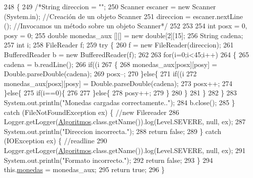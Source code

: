 \begin{DoxyCode}
248     \{
249         \textcolor{comment}{/*String direccion = "";}
250 \textcolor{comment}{        Scanner escaner = new Scanner (System.in); //Creación de un objeto Scanner}
251 \textcolor{comment}{        direccion = escaner.nextLine (); //Invocamos un método sobre un objeto Scanner*/}
252         
253         
254         \textcolor{keywordtype}{int} posx = 0, posy = 0;
255         \textcolor{keywordtype}{double} monedas\_aux [][] = \textcolor{keyword}{new} \textcolor{keywordtype}{double}[2][15];
256         String cadena;
257         \textcolor{keywordtype}{int} i;
258         FileReader f;
259         \textcolor{keywordflow}{try} \{
260             f = \textcolor{keyword}{new} FileReader(direccion);
261             BufferedReader b = \textcolor{keyword}{new} BufferedReader(f);
262             
263             \textcolor{keywordflow}{for}(i=0;i<45;i++)
264             \{
265                 cadena = b.readLine();
266                 \textcolor{keywordflow}{if}((i%
267                 \{
268                     monedas\_aux[posx][posy] = Double.parseDouble(cadena);
269                     posx--;
270                 \}\textcolor{keywordflow}{else}\{
271                     \textcolor{keywordflow}{if}((i%
272                         monedas\_aux[posx][posy] = Double.parseDouble(cadena);
273                         posx++;
274                     \}\textcolor{keywordflow}{else}\{
275                         \textcolor{keywordflow}{if}(i==0)\{
276                             
277                         \}\textcolor{keywordflow}{else}\{
278                             posy++;
279                         \}
280                     \}
281                 \}
282             \}
283             System.out.println(\textcolor{stringliteral}{"Monedas cargadas correctamente.."});
284             b.close();
285         \} \textcolor{keywordflow}{catch} (FileNotFoundException ex) \{ \textcolor{comment}{//new Filereader}
286             Logger.getLogger(\mbox{\hyperlink{classalgoritmia2_1_1_algoritmos_af7746e9d1d89571233f5e9f05a429603}{Algoritmos}}.class.getName()).log(Level.SEVERE, null, ex);
287             System.out.println(\textcolor{stringliteral}{"Direccion incorrecta."});
288             \textcolor{keywordflow}{return} \textcolor{keyword}{false};
289         \} \textcolor{keywordflow}{catch} (IOException ex) \{ \textcolor{comment}{//readline}
290             Logger.getLogger(\mbox{\hyperlink{classalgoritmia2_1_1_algoritmos_af7746e9d1d89571233f5e9f05a429603}{Algoritmos}}.class.getName()).log(Level.SEVERE, null, ex);
291             System.out.println(\textcolor{stringliteral}{"Formato incorrecto."});
292             \textcolor{keywordflow}{return} \textcolor{keyword}{false};
293         \}
294         this.\mbox{\hyperlink{classalgoritmia2_1_1_algoritmos_a7c670acfc4ef3b85c2e6908773014a13}{monedas}} = monedas\_aux;
295         \textcolor{keywordflow}{return} \textcolor{keyword}{true};
296     \}
\end{DoxyCode}
